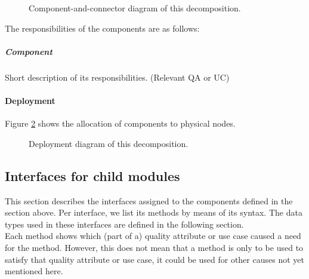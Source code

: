         \begin{figure}[!h]
        	\centering
        	\caption{Component-and-connector diagram of this decomposition.}
            \label{fig:FIGURELABEL}
        \end{figure}

        The responsibilities of the components are as follows:

    \subparagraph{Component}
        Short description of its responsibilities. (Relevant QA or UC)




    \paragraph{Deployment}
        Figure \ref{fig:FIGURELABEL} shows the allocation of components
        to physical nodes.

        \begin{figure}[!h]
        	\centering
        	\caption{Deployment diagram of this decomposition.}
            \label{fig:FIGURELABEL}
        \end{figure}


\subsection{Interfaces for child modules}\label{add2-interfaces}
    This section describes the interfaces assigned to the components defined
    in the section above. Per interface, we list its methods by means of its
    syntax. The data types used in these interfaces are defined in the following section. \\

    Each method shows which (part of a) quality attribute or use case caused
    a need for the method. However, this does not mean that a method is
    only to be used to satisfy that quality  attribute or use case, it could
    be used for other causes not yet mentioned here.

